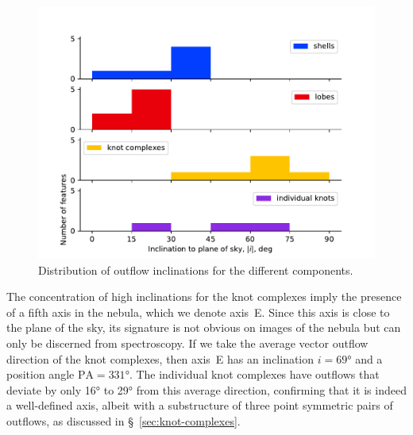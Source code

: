 \documentclass[useAMS, usenatbib]{mnras}
\begin{document}
\begin{figure}
  \centering
  \includegraphics[width=\linewidth]{figs/turtle-inclination-histogram}
  \caption{Distribution of outflow inclinations for the different components.}
  \label{fig:inclinations}
\end{figure}

The concentration of high inclinations for the knot complexes imply the presence of a fifth axis in the nebula, which we denote axis~E.
Since this axis is close to the plane of the sky,
its signature is not obvious on images of the nebula but can only be discerned from spectroscopy.
If we take the average vector outflow direction of the knot complexes,
then axis~E has an inclination \(i = \ang{69}\)
and a position angle \(\mathrm{PA} = \ang{331}\).
The individual knot complexes have outflows that deviate by only \ang{16} to \ang{29} from this average direction,
confirming that it is indeed a well-defined axis,
albeit with a substructure of three point symmetric pairs of outflows,
as discussed in \S~\ref{sec:knot-complexes}.
\end{document}

